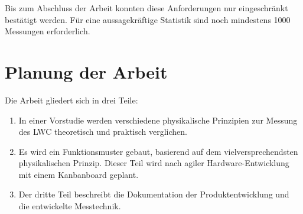 Bis zum Abschluss der Arbeit konnten diese Anforderungen nur eingeschränkt bestätigt werden. Für eine aussagekräftige Statistik sind noch mindestens 1000 Messungen erforderlich.

\section{Planung der Arbeit}

Die Arbeit gliedert sich in drei Teile:
\begin{enumerate}
    \item In einer Vorstudie werden verschiedene physikalische Prinzipien zur Messung des LWC theoretisch und praktisch verglichen.
    \item Es wird ein Funktionsmuster gebaut, basierend auf dem vielversprechendsten physikalischen Prinzip. Dieser Teil wird nach agiler Hardware-Entwicklung mit einem Kanbanboard geplant.
    \item Der dritte Teil beschreibt die Dokumentation der Produktentwicklung und die entwickelte Messtechnik.
\end{enumerate}
\fi
